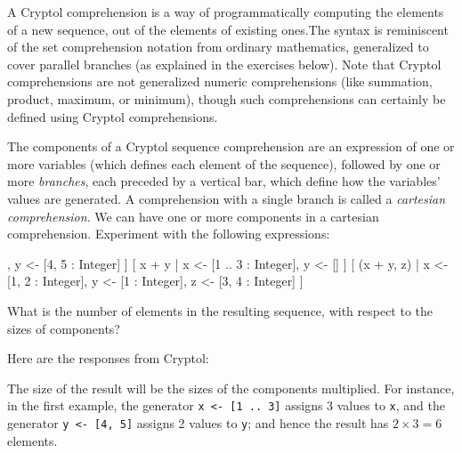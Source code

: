 A Cryptol comprehension is a way of programmatically computing the
elements of a new sequence, out of the elements of existing
ones.\indComp  The syntax is reminiscent of the set comprehension
notation from ordinary mathematics, generalized to cover parallel
branches (as explained in the exercises below).  Note that Cryptol
comprehensions are not generalized numeric comprehensions (like
summation, product, maximum, or minimum), though such comprehensions
can certainly be defined using Cryptol comprehensions.

\restartrepl
\begin{Exercise}\label{ex:seq:4}
  The components of a Cryptol sequence comprehension are an expression
  of one or more variables (which defines each element of the
  sequence), followed by one or more \emph{branches}, each preceded by
  a vertical bar, which define how the variables' values are
  generated. A comprehension with a single branch is called a
  \emph{cartesian comprehension}. We can have one or more components
  in a cartesian comprehension. Experiment with the following
  expressions:\indComp\indCartesian
\begin{replinVerb}
   [ (x, y) | x <- [1 .. 3 : Integer], y <- [4, 5 : Integer] ]
   [ x + y  | x <- [1 .. 3 : Integer], y <- [] ]
   [ (x + y, z) | x <- [1, 2 : Integer], y <- [1 : Integer], z <- [3, 4 : Integer] ]
\end{replinVerb}
What is the number of elements in the resulting sequence, with respect
to the sizes of components?

\end{Exercise}
\begin{Answer}
Here are the responses from Cryptol:
\begin{reploutVerb}
  [(1, 4), (1, 5), (2, 4), (2, 5), (3, 4), (3, 5)]
  []
  [(2, 3), (2, 4), (3, 3), (3, 4)]
\end{reploutVerb}
The size of the result will be the sizes of the components
multiplied. For instance, in the first example, the generator
\texttt{x <- [1 ..\ 3]} assigns 3 values to \texttt{x}, and the generator
\texttt{y <- [4, 5]} assigns 2 values to \texttt{y}; and hence the result has
$2\times 3 = 6$ elements.
\end{Answer}

